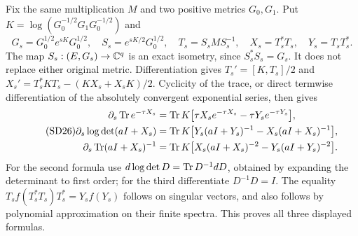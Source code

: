 \documentclass[11pt]{article}
\begin{document}
Fix the same multiplication $M$ and two positive metrics $G_0,G_1$.
Put $K=\log(G_0^{-1/2}G_1G_0^{-1/2})$ and
\[
G_s=G_0^{1/2}e^{sK}G_0^{1/2},\quad
S_s=e^{sK/2}G_0^{1/2},\quad T_s=S_sMS_s^{-1},\quad
X_s=T_s^*T_s,\quad Y_s=T_sT_s^*.
\]
The map $S_s:(E,G_s)\to\mathbb C^q$ is an exact isometry, since
$S_s^*S_s=G_s$. It does not replace either original metric.
Differentiation gives $T_s'=[K,T_s]/2$ and
$X_s'=T_s^*KT_s-(KX_s+X_sK)/2$. Cyclicity of the trace, or direct
termwise differentiation of the absolutely convergent exponential
series, then gives
\begin{equation}\tag{SD26}
\begin{aligned}
\partial_s\operatorname{Tr} e^{-\tau X_s}
&=\operatorname{Tr} K\bigl[\tau X_se^{-\tau X_s}-\tau Y_se^{-\tau Y_s}\bigr],\\
\partial_s\log\det(aI+X_s)
&=\operatorname{Tr} K\bigl[Y_s(aI+Y_s)^{-1}-X_s(aI+X_s)^{-1}\bigr],\\
\partial_s\operatorname{Tr}(aI+X_s)^{-1}
&=\operatorname{Tr} K\bigl[X_s(aI+X_s)^{-2}-Y_s(aI+Y_s)^{-2}\bigr].
\end{aligned}
\end{equation}
For the second formula use $d\log\det D=\operatorname{Tr} D^{-1}dD$, obtained by
expanding the determinant to first order; for the third differentiate
$D^{-1}D=I$. The equality
$T_s f(T_s^*T_s)T_s^*=Y_sf(Y_s)$ follows on singular vectors, and
also follows by polynomial approximation on their finite spectra.
This proves all three displayed formulas.
\end{document}

